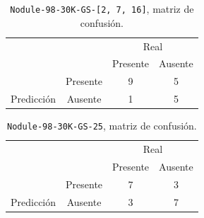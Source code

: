 \begin{table}[h]
\centering
\begin{tabular}{cc|cc|}
\cline{3-4}
 &  & \multicolumn{2}{c|}{\cellcolor[HTML]{FFC702}Real} \\ \cline{3-4}
 &  & \multicolumn{1}{c|}{\cellcolor[HTML]{FFC702}Presente} & \cellcolor[HTML]{FFC702}Ausente \\ \hline
\multicolumn{1}{|c|}{\cellcolor[HTML]{FFC702}} & \cellcolor[HTML]{FFC702}Presente & \multicolumn{1}{c|}{9} & 5 \\ \cline{2-4}
\multicolumn{1}{|c|}{\multirow{-2}{*}{\cellcolor[HTML]{FFC702}Predicción}} & \cellcolor[HTML]{FFC702}Ausente & \multicolumn{1}{c|}{1} & 5 \\ \hline
\end{tabular}
    \caption[Nodule-98-30K-GS-2, 7, 16: Matriz de confusión]{\lstinline!Nodule-98-30K-GS-[2, 7, 16]!, matriz de confusión.}
    \label{table:2-7-16_confusion}
\end{table}
\begin{table}[h]
    \centering
    \begin{tabular}{cc|cc|}
    \cline{3-4}
     &  & \multicolumn{2}{c|}{\cellcolor[HTML]{FFC702}Real} \\ \cline{3-4}
     &  & \multicolumn{1}{c|}{\cellcolor[HTML]{FFC702}Presente} & \cellcolor[HTML]{FFC702}Ausente \\ \hline
    \multicolumn{1}{|c|}{\cellcolor[HTML]{FFC702}} & \cellcolor[HTML]{FFC702}Presente & \multicolumn{1}{c|}{7} & 3 \\ \cline{2-4}
    \multicolumn{1}{|c|}{\multirow{-2}{*}{\cellcolor[HTML]{FFC702}Predicción}} & \cellcolor[HTML]{FFC702}Ausente & \multicolumn{1}{c|}{3} & 7 \\ \hline
    \end{tabular}

    \caption[Nodule-98-30K-GS-25: Matriz de confusión]{\lstinline!Nodule-98-30K-GS-25!, matriz de confusión.}
    \label{tab:25_confusion}
\end{table}


